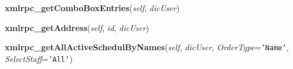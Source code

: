     \label{cuon:Address:Address:xmlrpc_getComboBoxEntries}

    \vspace{0.5ex}

\hspace{.8\funcindent}\begin{boxedminipage}{\funcwidth}

    \raggedright \textbf{xmlrpc\_getComboBoxEntries}(\textit{self}, \textit{dicUser})

\setlength{\parskip}{2ex}
\setlength{\parskip}{1ex}
    \end{boxedminipage}

    \label{cuon:Address:Address:xmlrpc_getAddress}

    \vspace{0.5ex}

\hspace{.8\funcindent}\begin{boxedminipage}{\funcwidth}

    \raggedright \textbf{xmlrpc\_getAddress}(\textit{self}, \textit{id}, \textit{dicUser})

\setlength{\parskip}{2ex}
\setlength{\parskip}{1ex}
    \end{boxedminipage}

    \label{cuon:Address:Address:xmlrpc_getAllActiveSchedulByNames}

    \vspace{0.5ex}

\hspace{.8\funcindent}\begin{boxedminipage}{\funcwidth}

    \raggedright \textbf{xmlrpc\_getAllActiveSchedulByNames}(\textit{self}, \textit{dicUser}, \textit{OrderType}={\tt \texttt{'}\texttt{Name}\texttt{'}}, \textit{SelectStaff}={\tt \texttt{'}\texttt{All}\texttt{'}})

\setlength{\parskip}{2ex}
\setlength{\parskip}{1ex}
    \end{boxedminipage}

